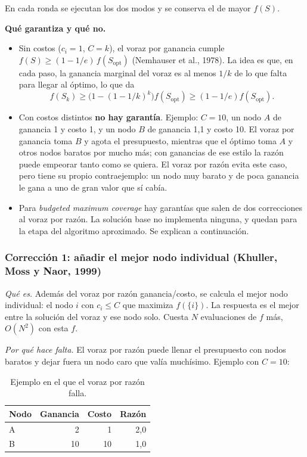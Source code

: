 \documentclass[11pt,a4paper]{article}
\begin{document}
En cada ronda se ejecutan los dos modos y se conserva el de mayor $f(S)$.

\textbf{Qué garantiza y qué no.}

\begin{itemize}[leftmargin=*,label=$\bullet$]
  \item Sin costos ($c_i=1$, $C=k$), el voraz por ganancia cumple
  $f(S)\ge(1-1/e)\,f(S_{\mathrm{opt}})$ (Nemhauser et al., 1978). La idea es
  que, en cada paso, la ganancia marginal del voraz es al menos $1/k$ de lo que
  falta para llegar al óptimo, lo que da
  \[
    f(S_k)\ge\bigl(1-(1-1/k)^k\bigr)f(S_{\mathrm{opt}})
    \ge(1-1/e)f(S_{\mathrm{opt}}).
  \]
  \item Con costos distintos \textbf{no hay garantía}. Ejemplo: $C=10$, un nodo
  $A$ de ganancia 1 y costo 1, y un nodo $B$ de ganancia 1{,}1 y costo 10. El
  voraz por ganancia toma $B$ y agota el presupuesto, mientras que el óptimo
  toma $A$ y otros nodos baratos por mucho más; con ganancias de ese estilo la
  razón puede empeorar tanto como se quiera. El voraz por razón evita este
  caso, pero tiene su propio contraejemplo: un nodo muy barato y de poca
  ganancia le gana a uno de gran valor que sí cabía.
  \item Para \emph{budgeted maximum coverage} hay garantías que salen de dos
  correcciones al voraz por razón. La solución base no implementa ninguna, y
  quedan para la etapa del algoritmo aproximado. Se explican a continuación.
\end{itemize}

\subsubsection{Corrección 1: añadir el mejor nodo individual (Khuller, Moss y Naor, 1999)}

\emph{Qué es.} Además del voraz por razón ganancia/costo, se calcula el mejor
nodo individual: el nodo $i$ con $c_i\le C$ que maximiza $f(\{i\})$. La
respuesta es el mejor entre la solución del voraz y ese nodo solo. Cuesta $N$
evaluaciones de $f$ más, $O(N^2)$ con esta $f$.

\emph{Por qué hace falta.} El voraz por razón puede llenar el presupuesto con
nodos baratos y dejar fuera un nodo caro que valía muchísimo. Ejemplo con
$C=10$:

\begin{table}[htbp]
\centering
\small
\begin{tabular}{@{}lrrr@{}}
\toprule
Nodo & Ganancia & Costo & Razón \\
\midrule
A & 2  & 1  & 2{,}0 \\
B & 10 & 10 & 1{,}0 \\
\bottomrule
\end{tabular}
\caption{Ejemplo en el que el voraz por razón falla.}
\end{table}
\end{document}
